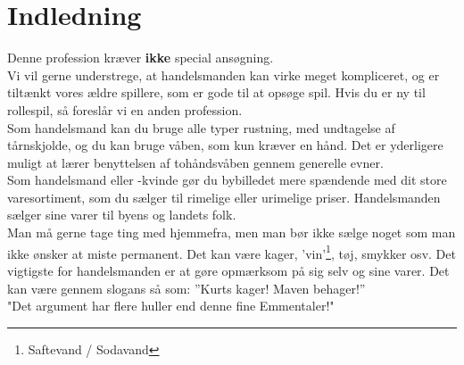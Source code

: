 \chapter*{Indledning}
Denne profession kræver \textbf{ikke} special ansøgning.\\

Vi vil gerne understrege, at handelsmanden kan virke meget kompliceret, og er tiltænkt vores ældre spillere, som er gode til at opsøge spil. Hvis du er ny til rollespil, så foreslår vi en anden profession.\\

Som handelsmand kan du bruge alle typer rustning, med undtagelse af tårnskjolde, og du kan bruge våben, som kun kræver en hånd. Det er yderligere muligt at lærer benyttelsen af tohåndsvåben gennem generelle evner.\\

Som handelsmand eller -kvinde gør du bybilledet mere spændende med dit store varesortiment, som du sælger til rimelige eller urimelige priser. Handelsmanden sælger sine varer til byens og landets folk.\\
Man må gerne tage ting med hjemmefra, men man bør ikke sælge noget som man ikke ønsker at miste permanent. Det kan være kager, 'vin'\footnote{Saftevand / Sodavand}, tøj, smykker osv. Det vigtigste for handelsmanden er at gøre opmærksom på sig selv og sine varer. Det kan være gennem slogans så som: ”Kurts kager! Maven behager!”\\
"Det argument har flere huller end denne fine Emmentaler!"\\